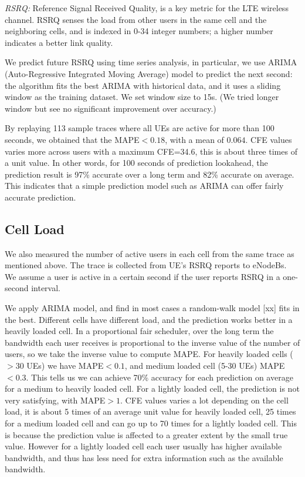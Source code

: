 \emph{RSRQ:} Reference Signal Received Quality, is a key metric for the LTE wireless channel. RSRQ senses the load from other users in the same cell and the neighboring cells, and is indexed in 0-34 integer numbers; a higher number indicates a better link quality. 

We predict future RSRQ using time series analysis, in particular, we use ARIMA (Auto-Regressive Integrated Moving Average) model to predict the next second: the algorithm fits the best ARIMA with historical data, and it uses a sliding window as the training dataset. We set window size to 15s. (We tried longer window but see no significant improvement over accuracy.) 

By replaying 113 sample traces where all UEs are active for more than 100 seconds, we obtained that the MAPE$<0.18$, with a mean of $0.064$. CFE values varies more across users with a maximum CFE=34.6, this is about three times of a unit value. In other words, for 100 seconds of prediction lookahead, the prediction result is 97\% accurate over a long term and 82\% accurate on average. This indicates that a simple prediction model such as ARIMA can offer fairly accurate prediction. 

\subsection{Cell Load}\label{subsec:NUser}
We also measured the number of active users in each cell from the same trace as mentioned above. The trace is collected from UE's RSRQ reports to eNodeBs. We assume a user is active in a certain second if the user reports RSRQ in a one-second interval. 

We apply ARIMA model, and find in most cases a random-walk model [xx] fits in the best. Different cells have different load, and the prediction works better in a heavily loaded cell. 
In a proportional fair scheduler, over the long term the bandwidth each user receives is proportional to the inverse value of the number of users, so we take the inverse value to compute MAPE. For heavily loaded cells ($>30$ UEs) we have MAPE$<0.1$, and medium loaded cell (5-30 UEs) MAPE$<0.3$. This tells us we can achieve 70\% accuracy for each prediction on average for a medium to heavily loaded cell. For a lightly loaded cell, the prediction is not very satisfying, with MAPE$>1$. CFE values varies a lot depending on the cell load, it is about 5 times of an average unit value for heavily loaded cell, 25 times for a medium loaded cell and can go up to 70 times for a lightly loaded cell. This is because the prediction value is affected to a greater extent by the small true value. However for a lightly loaded cell each user usually has higher available bandwidth, and thus has less need for extra information such as the available bandwidth.  










